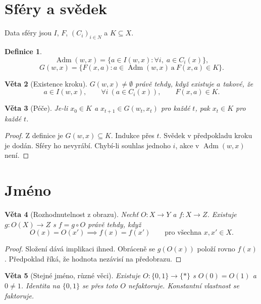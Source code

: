 \documentclass[11pt,a4paper]{article}
\newtheorem{theorem}{Věta}
\theoremstyle{definition}
\newtheorem{definition}[theorem]{Definice}
\theoremstyle{remark}
\newcommand{\Adm}{\operatorname{Adm}}
\begin{document}
\section{Sféry a svědek}

Data sféry jsou \(I\), \(F\), \((C_i)_{i\in N}\) a \(K\subseteq X\).

\begin{definition}
\[
  \Adm(w,x)
  =
  \bigl\{a\in I(w,x):\forall i,\; a\in C_i(x)\bigr\},
\]
\[
  G(w,x)
  =
  \bigl\{F(x,a):a\in\Adm(w,x)\ \text{a}\ F(x,a)\in K\bigr\}.
\]
\end{definition}

\begin{theorem}[Existence kroku]
\(G(w,x)\neq\emptyset\) právě tehdy, když existuje \(a\) takové, že
\[
  a\in I(w,x),
  \qquad
  \forall i\ (a\in C_i(x)),
  \qquad
  F(x,a)\in K.
\]
\end{theorem}

\begin{theorem}[Péče]
Je-li \(x_0\in K\) a \(x_{t+1}\in G(w_t,x_t)\) pro každé \(t\), pak \(x_t\in K\) pro každé \(t\).
\end{theorem}

\begin{proof}
Z definice je \(G(w,x)\subseteq K\). Indukce přes \(t\).
Svědek v předpokladu kroku je dodán. Sféry ho nevyrábí.
Chybí-li souhlas jednoho \(i\), akce v \(\Adm(w,x)\) není.
\end{proof}

\section{Jméno}

\begin{theorem}[Rozhodnutelnost z obrazu]
Nechť \(O\colon X\to Y\) a \(f\colon X\to Z\).
Existuje \(g\colon O(X)\to Z\) s \(f=g\circ O\) právě tehdy, když
\[
  O(x)=O(x')\implies f(x)=f(x')
  \qquad\text{pro všechna }x,x'\in X.
\]
\end{theorem}

\begin{proof}
Složení dává implikaci ihned.
Obráceně se \(g(O(x))\) položí rovno \(f(x)\).
Předpoklad říká, že hodnota nezávisí na předobrazu.
\end{proof}

\begin{theorem}[Stejné jméno, různé věci]
Existuje \(O\colon\{0,1\}\to\{\ast\}\) s \(O(0)=O(1)\) a \(0\neq 1\).
Identita na \(\{0,1\}\) se přes toto \(O\) nefaktoruje.
Konstantní vlastnost se faktoruje.
\end{theorem}
\end{document}
